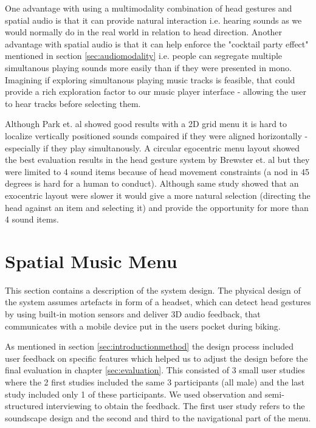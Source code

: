 One advantage with using a multimodality combination of head gestures and spatial audio is that it can provide natural interaction \cite{gaver_auditory_1986} i.e. hearing sounds as we would normally do in the real world in relation to head direction. Another advantage with spatial audio is that it can help enforce the "cocktail party effect" mentioned in section \ref{sec:audiomodality} i.e. people can segregate multiple simultanous playing sounds more easily than if they were presented in mono. Imagining if exploring simultanous playing music tracks is feasible, that could provide a rich exploration factor to our music player interface - allowing the user to hear tracks before selecting them.

Although Park et. al \cite{park_gaze-directed_2011} showed good results with a 2D grid menu it is hard to localize vertically positioned sounds compaired if they were aligned horizontally - especially if they play simultanously. A circular egocentric menu layout showed the best evaluation results in the head gesture system by Brewster et. al \cite{brewster_multimodal_2003} but they were limited to 4 sound items because of head movement constraints (a nod in 45 degrees is hard for a human to conduct). Although same study showed that an exocentric layout were slower it would give a more natural selection (directing the head against an item and selecting it) and provide the opportunity for more than 4 sound items.


\section{Spatial Music Menu}
This section contains a description of the system design. The physical design of the system assumes artefacts in form of a headset, which can detect head gestures by using built-in motion sensors and deliver 3D audio feedback, that communicates with a mobile device put in the users pocket during biking.

As mentioned in section \ref{sec:introductionmethod} the design process included user feedback on specific features which helped us to adjust the design before the final evaluation in chapter \ref{sec:evaluation}. This consisted of 3 small user studies where the 2 first studies included the same 3 participants (all male) and the last study included only 1 of these participants. We used observation and semi-structured interviewing \cite{benyon_designing_2010} to obtain the feedback. The first user study refers to the soundscape design and the second and third to the navigational part of the menu.

